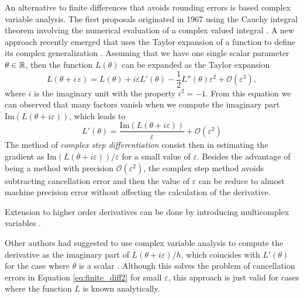 An alternative to finite differences that avoids rounding errors is based complex variable analysis. 
The first proposals originated in 1967 using the Cauchy integral theorem involving the numerical evaluation of a complex valued integral \cite{Lyness_1967, Lyness_Moler_1967} .
A new approach recently emerged that uses the Taylor expansion of a function to define its complex generalization \cite{Squire_Trapp_1998_complex_diff}. 
Assuming that we have one single scalar parameter $\theta \in \operatorname{\mathbb{R}}$, then the function $L(\theta)$ can be expanded as 
the Taylor expansion
\begin{equation}
    L(\theta + i \, \varepsilon)
    = 
    L(\theta) + i \varepsilon L'(\theta) 
    - 
    \frac 1 2
    L''(\theta) \varepsilon^2
    + 
    \mathcal O (\varepsilon^3),
\end{equation}
where $i$ is the imaginary unit with the property $i^2 = -1$. 
From this equation we can observed that many factors vanish when we compute the imaginary part $\text{Im}(L(\theta + i \varepsilon))$, which leads to
\begin{equation}
    L'(\theta) 
    = 
    \frac{\text{Im}(L(\theta + i \varepsilon))}{\varepsilon}
    + 
    \mathcal{O} (\varepsilon^2)
\end{equation}
The method of \textit{complex step differentiation} consist then in estimating the gradient as $\text{Im}(L(\theta + i \varepsilon)) / \varepsilon$ for a small value of $\varepsilon$. 
Besides the advantage of being a method with precision $\mathcal{O}(\varepsilon^2)$, the complex step method avoids subtracting cancellation error and then the value of $\varepsilon$ can be reduce to almost machine precision error without affecting the calculation of the derivative. 

Extension to higher order derivatives can be done by introducing multicomplex variables \cite{Lantoine_Russell_Dargent_2012}. 

Other authors had suggested to use complex variable analysis to compute the derivative as the imaginary part of $L(\theta + i \varepsilon)/h$, which coincides with $L'(\theta)$ for the case where $\theta$ is a scalar \cite{ Martins_Sturdza_Alonso_2003_complex_differentiation}.
Although this solves the problem of cancellation errors in Equation \eqref{eq:finite_diff2} for small $\varepsilon$, this approach is just valid for cases where the function $L$ is known analytically. 
